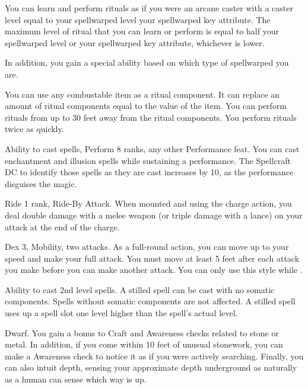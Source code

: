 \featben You can learn and perform rituals as if you were an arcane caster with a caster level equal to your spellwarped level \add your spellwarped key attribute.
The maximum level of ritual that you can learn or perform is equal to half your spellwarped level or your spellwarped key attribute, whichever is lower.

In addition, you gain a special ability based on which type of spellwarped you are.

 \x
{}
You can use any combustable item as a ritual component.
It can replace an amount of ritual components equal to the value of the item.
You can perform rituals from up to 30 feet away from the ritual components.
You perform rituals twice as quickly.

\featpre Ability to cast spells, Perform 8 ranks, any other Performance feat.
\featben You can cast enchantment and illusion spells while sustaining a performance.
The Spellcraft DC to identify those spells as they are cast increases by 10, as the performance disguises the magic.

\featpres
Ride 1 rank, Ride-By Attack.
\featben When mounted and using the charge action, you deal double damage with a melee weapon (or triple damage with a lance) on your attack at the end of the charge.%

\featpres
Dex 3, Mobility, two attacks.
\featben As a full-round action, you can move up to your speed and make your full attack.
You must move at least 5 feet after each attack you make before you can make another attack.
You can only use this style while \unencumbered.

\featpre Ability to cast 2nd level spells.
\featben A stilled spell can be cast with no somatic components.
Spells without somatic components are not affected.
A stilled spell uses up a spell slot one level higher than the spell's actual level.

\featpre Dwarf.
\featben You gain a  bonus to Craft and Awareness checks related to stone or metal.
In addition, if you come within 10 feet of unusual stonework, you can make a Awareness check to notice it as if you were actively searching.
Finally, you can also intuit depth, sensing your approximate depth underground as naturally as a human can sense which way is up.

